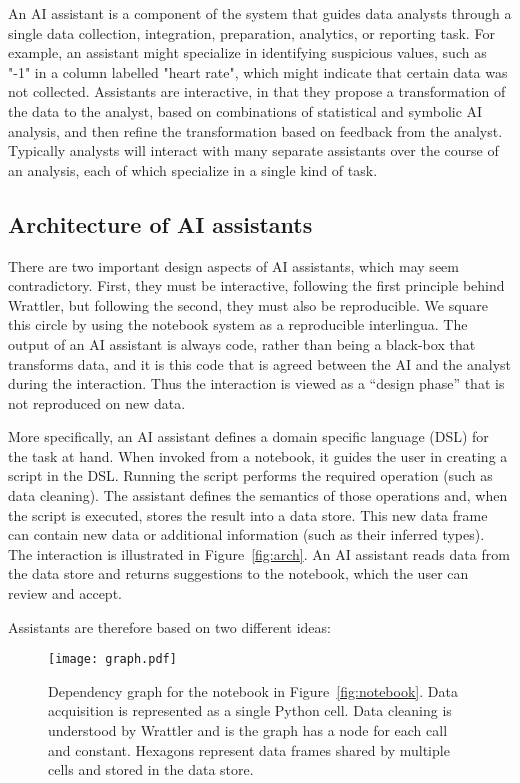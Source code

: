 \documentclass[sigplan,preprint,10pt]{acmart}\settopmatter{printfolios=true,printccs=false,printacmref=false}
\begin{document}
{
An AI assistant is a component
of the system that
guides data analysts through a single data collection, integration, preparation,
analytics, or reporting task.
For example, an assistant might
specialize in identifying suspicious
values, such as "-1" in a column labelled
"heart rate", which might indicate
that certain data was not collected.
Assistants are interactive, in that
they propose a transformation
of the data to the analyst, based on combinations
of statistical and symbolic AI analysis,
and then refine the transformation
based on feedback from the analyst.
Typically analysts will interact with many separate assistants over
the course of an analysis, each of which specialize in a single kind of task.

\subsection{Architecture of AI assistants}

There are two important design aspects of AI assistants, which may seem
contradictory.
 First, they must be interactive, following
 the first principle behind Wrattler, but
 following the second,
 they must also be reproducible.
We square this circle by using the notebook
system as a reproducible interlingua.
The output of an AI assistant is always code, rather
than being a black-box that transforms data,
and it is this code that is agreed between the AI and the analyst during the interaction.
Thus the interaction is viewed as a ``design phase''
that is not reproduced on new data.

More specifically, an AI assistant defines a domain specific language (DSL) for the task at hand. When invoked from
a notebook, it guides the user in creating a script in the DSL. Running the script performs
the required operation (such as data cleaning). The assistant defines the semantics
of those operations and, when the script is executed, stores the result into a data
store. This new data frame can contain new data or additional information (such as their
inferred types).
The interaction is illustrated in Figure~\ref{fig:arch}. An AI assistant reads data from the data
store and returns suggestions to the notebook, which the user can review and accept.

Assistants are therefore based on two different ideas:

\begin{figure}
\texttt{[image: graph.pdf]}

\caption{\small{Dependency graph for the notebook in Figure~\ref{fig:notebook}.
Data acquisition is represented as a single Python cell. Data cleaning is understood
by Wrattler and is the graph has a node for each call and constant. Hexagons represent
data frames shared by multiple cells and stored in the data store.}}
\label{fig:deps}
\vspace{-0.5em}
\end{figure}

}
\end{document}
